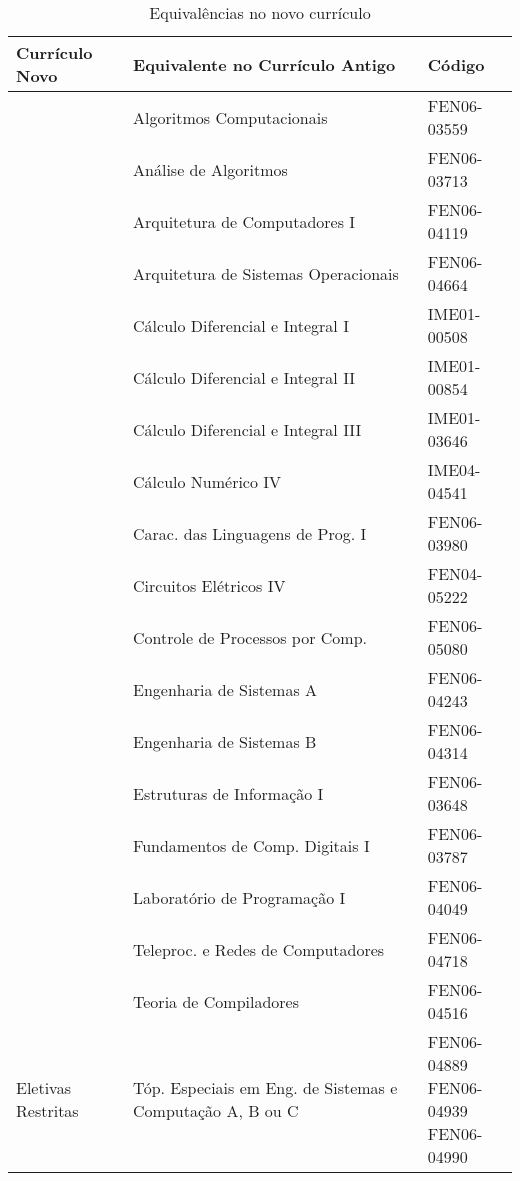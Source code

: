 \begin{table}
	\centering
	\renewcommand{\arraystretch}{1.5}
	\caption{Equivalências no novo currículo}
	\label{equivalencias}
	\begin{tabularx}{\textwidth}{|X||X|l|}
		\hline
		{\textbf{Currículo Novo}}	& \textbf{Equivalente no Currículo Antigo} 	& \textbf{Código}\\
		\hline
		\AlgComp	& Algoritmos Computacionais				    	& FEN06-03559       \\
		\AnAlg      & Análise de Algoritmos                       & FEN06-03713       \\
		\ArqComp    & Arquitetura de Computadores I               & FEN06-04119       \\
		\ProjSO     & Arquitetura de Sistemas Operacionais        & FEN06-04664       \\
		\CalcI      & Cálculo Diferencial e Integral I            & IME01-00508       \\
		\CalcII     & Cálculo Diferencial e Integral II           & IME01-00854       \\
		\CalcIII    & Cálculo Diferencial e Integral III          & IME01-03646       \\
		\EngComput  & Cálculo Numérico IV                         & IME04-04541       \\
		\LabProgB   & Carac. das Linguagens de Prog. I            & FEN06-03980       \\
		\CEVI       & Circuitos Elétricos IV                      & FEN04-05222       \\
		\Control    & Controle de Processos por Comp.             & FEN06-05080       \\
		\EngSistA   & Engenharia de Sistemas A					& FEN06-04243       \\
		\ProjBD     & Engenharia de Sistemas B                    & FEN06-04314       \\
		\EstrInf    & Estruturas de Informação I                  & FEN06-03648       \\
		\FundComp   & Fundamentos de Comp. Digitais I    & FEN06-03787  				\\
		\LabProgA   & Laboratório de Programação I        & FEN06-04049                 \\
		\Telep      & Teleproc. e Redes de Computadores   & FEN06-04718                 \\
		\TeoComp                               & Teoria de Compiladores            & FEN06-04516                 \\
		Eletivas Restritas & Tóp. Especiais em Eng. de Sistemas e Computação A, B ou C & \parbox[t]{2cm}{FEN06-04889                                          \\FEN06-04939\\FEN06-04990}  \\
		\hline
	\end{tabularx}
\end{table}

